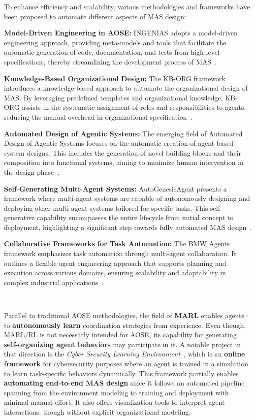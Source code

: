 \documentclass[pdflatex,sn-mathphys-num]{sn-jnl}%
\theoremstyle{thmstyleone}%
\theoremstyle{thmstyletwo}%
\theoremstyle{thmstylethree}%
\begin{document}
To enhance efficiency and scalability, various methodologies and frameworks have been proposed to automate different aspects of MAS design:

\textbf{Model-Driven Engineering in AOSE:} INGENIAS adopts a model-driven engineering approach, providing meta-models and tools that facilitate the automatic generation of code, documentation, and tests from high-level specifications, thereby streamlining the development process of MAS~\cite{Pavon2003}.

\textbf{Knowledge-Based Organizational Design:} The KB-ORG framework introduces a knowledge-based approach to automate the organizational design of MAS. By leveraging predefined templates and organizational knowledge, KB-ORG assists in the systematic assignment of roles and responsibilities to agents, reducing the manual overhead in organizational specification~\cite{Sims2008}.

\textbf{Automated Design of Agentic Systems:} The emerging field of Automated Design of Agentic Systems focuses on the automatic creation of agent-based system designs. This includes the generation of novel building blocks and their composition into functional systems, aiming to minimize human intervention in the design phase~\cite{smith2024automated}.

\textbf{Self-Generating Multi-Agent Systems:} AutoGenesisAgent presents a framework where multi-agent systems are capable of autonomously designing and deploying other multi-agent systems tailored for specific tasks. This self-generative capability encompasses the entire lifecycle from initial concept to deployment, highlighting a significant step towards fully automated MAS design~\cite{harper2024autogenesisagent}.

\textbf{Collaborative Frameworks for Task Automation:} The BMW Agents framework emphasizes task automation through multi-agent collaboration. It outlines a flexible agent engineering approach that supports planning and execution across various domains, ensuring scalability and adaptability in complex industrial applications~\cite{crawford2024bmw}.

\

Parallel to traditional AOSE methodologies, the field of \textbf{MARL} enables agents to \textbf{autonomously learn} coordination strategies from experience. Even though, MARL/RL is not necessarly intended for AOSE, its capability for generating \textbf{self-organizing agent behaviors} may participate in it.
A notable project in that direction is the \textit{Cyber Security Learning Environment}~\cite{hammar2023scalable}, which is an \textbf{online framework} for cybersecurity purposes where an agent is trained in a simulation to learn task-specific behaviors dynamically. This framework partially enables \textbf{automating end-to-end MAS design} since it follows an automated pipeline spanning from the environment modeling to training and deployment with minimal manual effort. It also offers visualization tools to interpret agent interactions, though without explicit organizational modeling.
\end{document}
